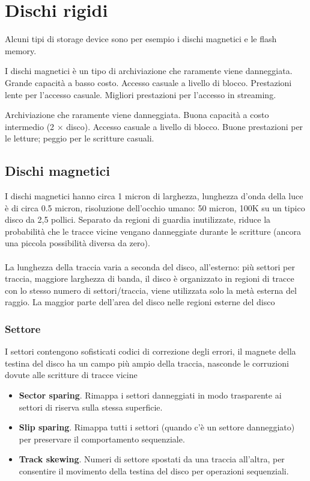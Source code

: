 \newpage
\section{Dischi rigidi}
Alcuni tipi di storage device sono per esempio i dischi magnetici e le flash memory.

\begin{definition}
    I dischi magnetici è un tipo di archiviazione che raramente viene danneggiata. 
    Grande capacità a basso costo. Accesso casuale a livello di blocco. 
    Prestazioni lente per l'accesso casuale. Migliori prestazioni per l'accesso in streaming.
\end{definition}

\begin{definition}
    Archiviazione che raramente viene danneggiata. Buona capacità a costo intermedio (2 \(\times\) disco). 
    Accesso casuale a livello di blocco. Buone prestazioni per le letture; peggio per le scritture casuali.
\end{definition}

\subsection{Dischi magnetici}
I dischi magnetici hanno circa 1 micron di larghezza, lunghezza d'onda della luce è di circa 0.5 micron, 
risoluzione dell'occhio umano: 50 micron, 100K su un tipico disco da 2,5 pollici. Separato da regioni 
di guardia inutilizzate, riduce la probabilità che le tracce vicine vengano danneggiate durante le scritture 
(ancora una piccola possibilità diversa da zero). \\\\
La lunghezza della traccia varia a seconda del disco, all'esterno: più settori per traccia, maggiore larghezza di banda, il disco è organizzato in regioni di tracce 
con lo stesso numero di settori/traccia, viene utilizzata solo la metà esterna del raggio. La maggior parte
dell'area del disco nelle regioni esterne del disco

\subsubsection{Settore}
I settori contengono sofisticati codici di correzione degli errori, il magnete della testina del disco ha un campo più ampio della traccia, nasconde le corruzioni dovute alle scritture di tracce vicine
\begin{itemize}
    \item \textbf{Sector sparing}. Rimappa i settori danneggiati in modo trasparente ai settori di riserva sulla stessa superficie.
    \item \textbf{Slip sparing}. Rimappa tutti i settori (quando c'è un settore danneggiato) per preservare il comportamento sequenziale.
    \item \textbf{Track skewing}. Numeri di settore spostati da una traccia all'altra, per consentire il movimento della testina del disco per operazioni sequenziali.
\end{itemize}

